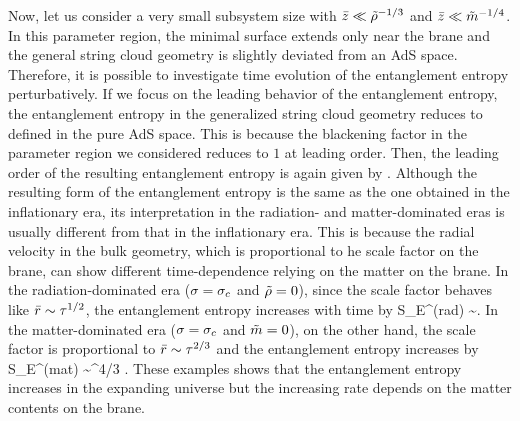 \documentclass[12pt]{article}
\begin{document}
Now, let us consider a very small subsystem size with $\bar{z} \ll \tilde{\rho}^{-1/3}$ and $\bar{z} \ll  \tilde{m}^{-1/4}$. In this parameter region, the minimal surface extends only near the brane and the general string cloud geometry is slightly deviated from an AdS space. Therefore, it is possible to investigate time evolution of the entanglement entropy perturbatively. If we focus on the leading behavior of the entanglement entropy, the entanglement entropy in the generalized string cloud geometry reduces to  defined in the pure AdS space. This is because the blackening factor in the parameter region we considered reduces to $1$ at leading order. Then, the leading order of the resulting entanglement entropy is again given by . Although the resulting form of the entanglement entropy is the same as the one obtained in the inflationary era, its interpretation in the radiation- and matter-dominated eras is usually different from that in the inflationary era. This is because the radial velocity in the bulk geometry, which is proportional to he scale factor on the brane, can show different time-dependence relying on the matter on the brane. In the radiation-dominated era ($\sigma=\sigma_c$ and $\tilde{\rho}=0$), since the scale factor behaves like $\bar{r} \sim  \tau^{1/2}$, the entanglement entropy increases with time by
\be
S_E^{(rad)}  \sim \ta .
\ee
In the matter-dominated era ($\sigma=\sigma_c$ and $\tilde{m}=0$), on the other hand, the scale factor is proportional to $\bar{r} \sim \tau^{2/3}$ and the entanglement entropy increases by
\be
S_E^{(mat)}  \sim \ta^{4/3} . 
\ee
These examples shows that the entanglement entropy increases in the expanding universe but the increasing rate depends on the matter contents on the brane.  
\end{document}
